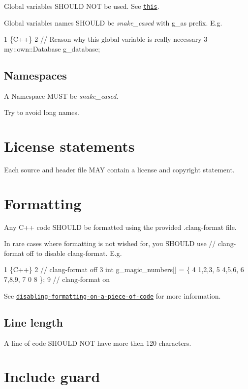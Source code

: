 Global variables S\+H\+O\+U\+LD N\+OT be used. See \href{#globals}{\tt this}.

Global variables names S\+H\+O\+U\+LD be {\itshape snake\+\_\+cased} with {\ttfamily g\+\_\+}as prefix. E.\+g. 
\begin{DoxyCode}
1 \{C++\}
2 // Reason why this global variable is really necessary
3 my::own::Database g\_database;
\end{DoxyCode}


\subsection*{Namespaces}

A Namespace M\+U\+ST be {\itshape snake\+\_\+cased}.

Try to avoid long names.

\section*{License statements}

Each source and header file M\+AY contain a license and copyright statement.

\section*{Formatting}

Any {\ttfamily C++} code S\+H\+O\+U\+LD be formatted using the provided {\ttfamily .clang-\/format} file.

In rare cases where formatting is not wished for, you S\+H\+O\+U\+LD use {\ttfamily // clang-\/format off} to disable clang-\/format. E.\+g. 
\begin{DoxyCode}
1 \{C++\}
2 // clang-format off
3 int g\_magic\_numbers[] = \{
4     1,2,3,
5     4,5,6,
6     7,8,9,
7       0
8 \};
9 // clang-format on
\end{DoxyCode}
 See \href{https://clang.llvm.org/docs/ClangFormatStyleOptions.html#disabling-formatting-on-a-piece-of-code}{\tt disabling-\/formatting-\/on-\/a-\/piece-\/of-\/code} for more information.

\subsection*{Line length}

A line of code S\+H\+O\+U\+LD N\+OT have more then 120 characters.

\section*{Include guard}


